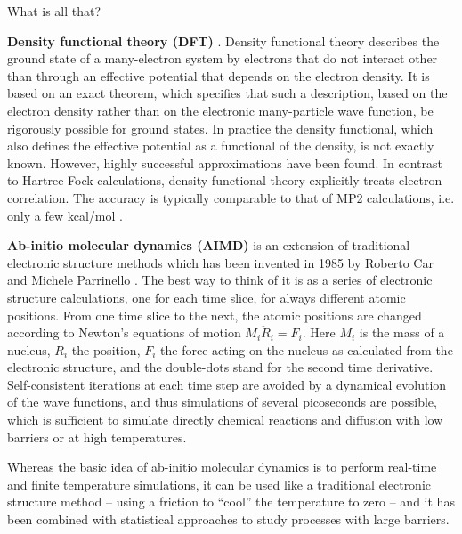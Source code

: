 \documentclass[final,12pt]{article}
\begin{document}
What is all that?

{\bf Density functional theory (DFT)}
\cite{hohenberg64_pr136_864,kohn65_pr140_1133}. Density functional
theory describes the ground state of a many-electron system by electrons that
do not interact other than through an effective potential that depends on the
electron density. It is based on an exact theorem, which specifies that such a
description, based on the electron density rather than on the electronic
many-particle wave function, be rigorously possible for ground states. In
practice the density functional, which also defines the effective potential as
a functional of the density, is not exactly known. However, highly successful
approximations have been found. In contrast to Hartree-Fock calculations,
density functional theory explicitly treats electron correlation. The accuracy
is typically comparable to that of MP2 calculations, i.e. only a few kcal/mol
\cite{becke92_jcp97_9173,dickson93_jcp99_3898}.

{\bf Ab-initio molecular dynamics (AIMD)}
\cite{car85_prl55_2471,car89_bookchapter_455,pastore91_pra44_6334} is an
extension of traditional electronic structure methods which has been invented
in 1985 by Roberto Car and Michele Parrinello \cite{car85_prl55_2471}.  The
best way to think of it is as a series of electronic structure calculations,
one for each time slice, for always different atomic positions. From one time
slice to the next, the atomic positions are changed according to Newton's
equations of motion $M_i\ddot R_i=F_i$.  Here $M_i$ is the mass of a nucleus,
$R_i$ the position, $F_i$ the force acting on the nucleus as calculated from
the electronic structure, and the double-dots stand for the second time
derivative.  Self-consistent iterations at each time step are avoided by a
dynamical evolution of the wave functions, and thus simulations of several
picoseconds are possible, which is sufficient to simulate directly chemical
reactions and diffusion with low barriers or at high temperatures.

Whereas the basic idea of ab-initio molecular dynamics is to perform
real-time and finite temperature simulations, it can be used like a
traditional electronic structure method -- using a friction to
``cool'' the temperature to zero -- and it has been combined
with statistical approaches to study processes with large barriers.
\end{document}
